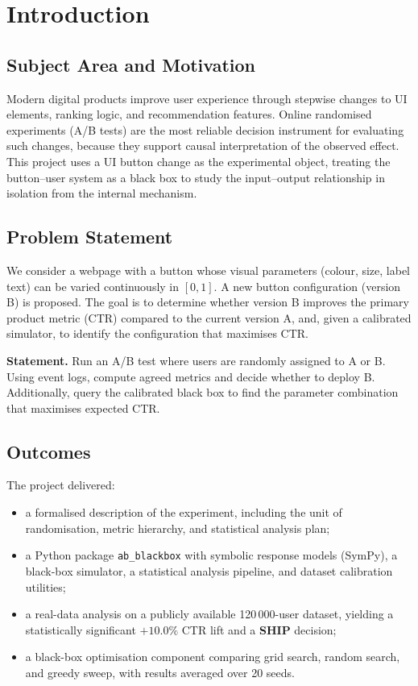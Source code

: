 \documentclass[a4paper,12pt]{extarticle}
\numberwithin{equation}{section}
\begin{document}
\clearpage

\section{Introduction}

\subsection{Subject Area and Motivation}
Modern digital products improve user experience through stepwise changes to
UI elements, ranking logic, and recommendation features. Online randomised
experiments (A/B tests) are the most reliable decision instrument for
evaluating such changes, because they support causal interpretation of the
observed effect. This project uses a UI button change as the experimental
object, treating the button--user system as a black box to study the
input--output relationship in isolation from the internal mechanism.

\subsection{Problem Statement}
We consider a webpage with a button whose visual parameters (colour, size,
label text) can be varied continuously in $[0, 1]$. A new button configuration
(version B) is proposed. The goal is to determine whether version B improves
the primary product metric (CTR) compared to the current version A, and, given
a calibrated simulator, to identify the configuration that maximises CTR.

\textbf{Statement.} Run an A/B test where users are randomly assigned to A or
B. Using event logs, compute agreed metrics and decide whether to deploy B.
Additionally, query the calibrated black box to find the parameter combination
that maximises expected CTR.

\subsection{Outcomes}
The project delivered:
\begin{itemize}
  \item a formalised description of the experiment, including the unit of
        randomisation, metric hierarchy, and statistical analysis plan;
  \item a Python package \texttt{ab\_blackbox} with symbolic response models
        (SymPy), a black-box simulator, a statistical analysis pipeline, and
        dataset calibration utilities;
  \item a real-data analysis on a publicly available 120\,000-user dataset,
        yielding a statistically significant $+10.0\%$ CTR lift and a
        \textbf{SHIP} decision;
  \item a black-box optimisation component comparing grid search, random
        search, and greedy sweep, with results averaged over 20 seeds.
\end{itemize}
\end{document}

